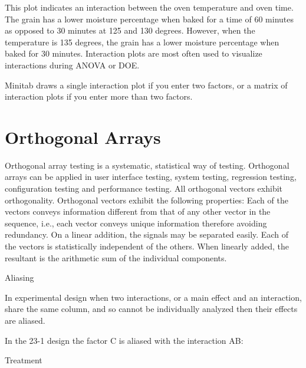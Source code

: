 \documentclass[]{article}
\begin{document}
This plot indicates an interaction between the oven temperature and oven time. The grain has a lower moisture percentage when baked for a time of 60 minutes as opposed to 30 minutes at 125 and 130 degrees. However, when the temperature is 135 degrees, the grain has a lower moisture percentage when baked for 30 minutes.
Interaction plots are most often used to visualize interactions during ANOVA or DOE.

Minitab draws a single interaction plot if you enter two factors, or a matrix of interaction plots if you enter more than two factors.


\section{Orthogonal Arrays}
Orthogonal array testing is a systematic, statistical way of testing. Orthogonal arrays can be applied in user interface testing, system testing, regression testing, configuration testing and performance testing.
All orthogonal vectors exhibit orthogonality. Orthogonal vectors exhibit the following properties:
Each of the vectors conveys information different from that of any other vector in the sequence, i.e., each vector conveys unique information therefore avoiding redundancy.
On a linear addition, the signals may be separated easily.
Each of the vectors is statistically independent of the others.
When linearly added, the resultant is the arithmetic sum of the individual components.

%
%
%

\newpage






Aliasing


In experimental design when two interactions, or a main effect and an interaction, share the same column, and so cannot be individually analyzed then their effects are aliased.

In the 23-1 design the factor C is aliased with the interaction AB:











Treatment
 
\end{document}
